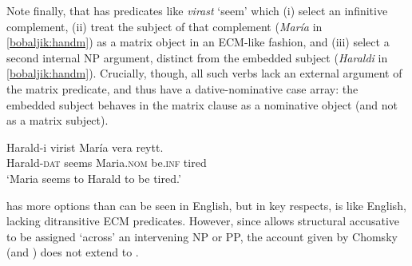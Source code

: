 \documentclass[output=paper]{langsci/langscibook}
\begin{document}
\begin{exe}
\ex \begin{xlista}


\end{xlista}
\end{exe}

\noindent Note finally, that  has predicates like \textit{vir{\dh}ast} `seem' which (i) select an infinitive complement, (ii) treat the subject of that complement (\textit{Mar\'ia} in \ref{bobaljik:handm}) as a matrix object in an ECM-like fashion, and (iii) select a second internal NP argument, distinct from the embedded subject (\textit{Haraldi} in \ref{bobaljik:handm}). Crucially, though, all such verbs lack an external argument of the matrix predicate, and thus have a dative-nominative case array: the embedded subject behaves in the matrix clause as a nominative object (and not as a matrix subject). 

\begin{exe}
\ex \label{bobaljik:handm} \gll Harald-i vir{\dh}ist Mar\'ia vera {\th}reytt. \\
Harald-{\scshape dat} seems Maria.{\scshape nom} be.{\scshape inf} tired \\
\glt `Maria seems to Harald to be tired.' 
\end{exe}

\noindent {} has more options than can be seen in English, but in key respects,  is like English, lacking ditransitive ECM predicates. However, since  allows structural accusative to be assigned `across' an intervening NP or PP, the account given by Chomsky (and \citealt{Boehorn2005}) does not extend to . 
\end{document}
